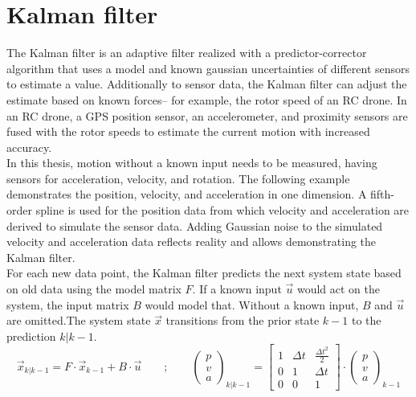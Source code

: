 \section{Kalman filter}
\label{sec:Kalmanfilter}
The Kalman filter is an adaptive filter realized with a predictor-corrector algorithm that uses a model and known gaussian uncertainties of different sensors to estimate a value. Additionally to sensor data, the Kalman filter can adjust the estimate based on known forces– for example, the rotor speed of an RC drone. In an RC drone, a GPS position sensor, an accelerometer, and proximity sensors are fused with the rotor speeds to estimate the current motion with increased accuracy.\\
In this thesis, motion without a known input needs to be measured, having sensors for acceleration, velocity, and rotation. The following example demonstrates the position, velocity, and acceleration in one dimension. A fifth-order spline is used for the position data from which velocity and acceleration are derived to simulate the sensor data. Adding Gaussian noise to the simulated velocity and acceleration data reflects reality and allows demonstrating the Kalman filter.\\
For each new data point, the Kalman filter predicts the next system state based on old data using the model matrix $F$. If a known input $\vec{u}$ would act on the system, the input matrix $B$ would model that. Without a known input, $B$ and $\vec{u}$ are omitted.The system state $\vec{x}$ transitions from the prior state $k-1$ to the prediction $k|k-1$. \\
\begin{equation*}
    \vec{x}_{k|k-1} = 
    F
    \cdot
    \vec{x}_{k-1}
    +
    B
    \cdot
    \vec{u} \qquad ; \qquad
    \begin{pmatrix}
        p  \\
        v  \\
        a 
    \end{pmatrix}_{k|k-1} = 
    \begin{bmatrix}
        1 & \Delta t & \frac{\Delta t^{2}}{2} \\
        0 & 1 & \Delta t \\
        0 & 0 & 1
    \end{bmatrix}
    \cdot
    \begin{pmatrix}
        p  \\
        v  \\
        a 
    \end{pmatrix}_{k-1}    
\end{equation*}
